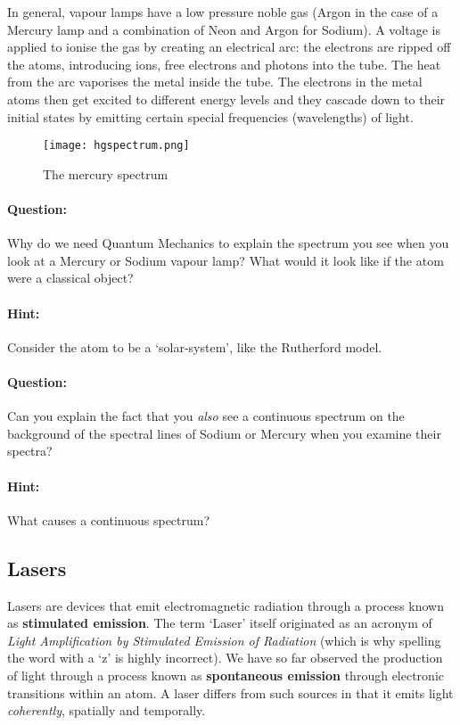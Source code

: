 In general, vapour lamps have a low pressure noble gas (Argon in the case of a Mercury lamp and a combination of Neon and Argon for Sodium). A voltage is applied to ionise the gas by creating an electrical arc: the electrons are ripped off the atoms, introducing ions, free electrons and photons into the tube. The heat from the arc vaporises the metal inside the tube. The electrons in the metal atoms then get excited to different energy levels and they cascade down to their initial states by emitting certain special frequencies (wavelengths) of light.

\begin{figure}[!htb]
\centering
\texttt{[image: hgspectrum.png]}
        \caption{The mercury spectrum}
        \label{hgspectrum}
\end{figure}


\begin{tcolorbox}
\paragraph{Question: } Why do we need Quantum Mechanics to explain the spectrum you see when you look at a Mercury or Sodium vapour lamp? What would it look like if the atom were a classical object? 
\paragraph{Hint: } Consider the atom to be a `solar-system', like the Rutherford model. 

\paragraph{Question: } Can you explain the fact that you \textit{also} see a continuous spectrum on the background of the spectral lines of Sodium or Mercury when you examine their spectra?
\paragraph{Hint: } What causes a continuous spectrum?
\end{tcolorbox}

\subsection{Lasers}

Lasers are devices that emit electromagnetic radiation through a process known as \textbf{stimulated emission}. The term `Laser' itself originated as an acronym of \textit{Light Amplification by Stimulated Emission of Radiation} (which is why spelling the word with a `z' is highly incorrect). We have so far observed the production of light through a process known as \textbf{spontaneous emission} through electronic transitions within an atom. A laser differs from such sources in that it emits light \textit{coherently}, spatially and temporally. 

